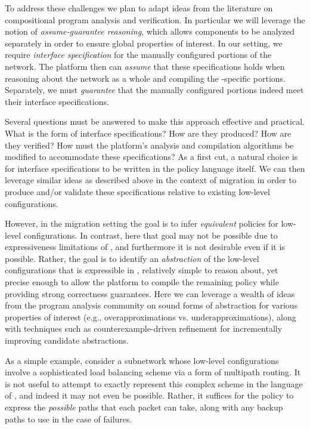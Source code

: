 To address these challenges we plan to adapt ideas from the literature on compositional program analysis and verification.  In particular we will leverage the notion of {\em assume-guarantee reasoning}, which allows components to be analyzed separately in order to ensure global properties of interest.  In our setting, we require {\em interface specification} for the manually configured portions of the network.  The \Name platform then can {\em assume} that these specifications holds when reasoning about the network as a whole and compiling the \Name-specific portions.  Separately, we must {\em guarantee} that the manually configured portions indeed meet their interface specifications.

Several questions must be answered to make this approach effective and practical.  What is the form of interface specifications?  How are they produced?  How are they verified?  How must the \Name platform's analysis and compilation algorithms be modified to accommodate these specifications?  As a first cut, a natural choice is for interface specifications to be written in the \Name policy language itself.  We can then leverage similar ideas as described above in the context of migration in order to produce and/or validate these specifications relative to existing low-level configurations.  

However, in the migration setting the goal is to infer {\em equivalent} \Name policies for low-level configurations.  In contrast, here that goal may not be possible due to expressiveness limitations of \Name, and furthermore it is not desirable even if it is possible. Rather, 
the goal is to identify an 
{\em abstraction} of the low-level configurations that is expressible in \Name, relatively simple to reason about, yet precise enough to allow the platform to compile the remaining \Name policy while providing strong correctness guarantees.  Here we can leverage a wealth of ideas from the program analysis community on sound forms of abstraction for various properties of interest (e.g., overapproximations vs. underapproximations), along with techniques such as counterexample-driven refinement for incrementally improving candidate abstractions.


As a simple example, consider a subnetwork whose low-level configurations involve a sophisticated load balancing scheme via a form of multipath routing.  It is not useful to attempt to exactly represent this complex scheme in the language of \Name, and indeed it may not even be possible.  Rather, it suffices for the \Name policy to express the {\em possible} paths that each packet can take, along with any backup paths to use in the case of failures.


